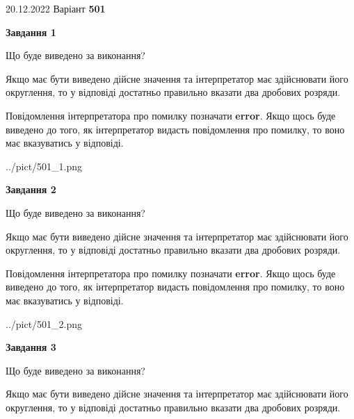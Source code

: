 \documentclass[12pt, ukrainian]{article}
\begin{document}
{20.12.2022 Варіант \No \textbf { 501 }\par}
{
\begin {Large}

{\begin {center}\textbf{Завдання 1}\end {center}}\par
Що буде виведено за виконання? \par

Якщо має бути виведено дійсне значення та інтерпретатор має здійснювати його округлення, 
то у відповіді достатньо правильно вказати два дробових розряди.

Повідомлення інтерпретатора про помилку позначати \textbf{error}.
Якщо щось буде виведено до того, як інтерпретатор видасть повідомлення про помилку, 
то воно має вказуватись у відповіді. \par

\begin{center}
	{../pict/501_1.png}
\end{center}
\newpage

{\begin {center}\textbf{Завдання 2}\end {center}}\par
Що буде виведено за виконання? \par

Якщо має бути виведено дійсне значення та інтерпретатор має здійснювати його округлення, 
то у відповіді достатньо правильно вказати два дробових розряди.

Повідомлення інтерпретатора про помилку позначати \textbf{error}.
Якщо щось буде виведено до того, як інтерпретатор видасть повідомлення про помилку, 
то воно має вказуватись у відповіді. \par

\begin{center}
	{../pict/501_2.png}
\end{center}
\newpage

{\begin {center}\textbf{Завдання 3}\end {center}}\par
Що буде виведено за виконання? \par

Якщо має бути виведено дійсне значення та інтерпретатор має здійснювати його округлення, 
то у відповіді достатньо правильно вказати два дробових розряди.


\end{Large}}
\end{document}
